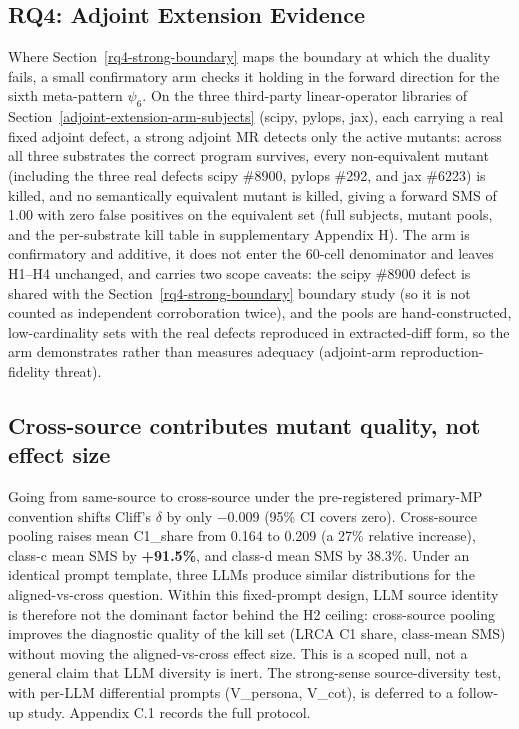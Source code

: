\documentclass[12pt]{article}
\begin{document}
\subsection{RQ4: Adjoint Extension Evidence}\label{rq4-adjoint-extension-arm}

Where Section~\ref{rq4-strong-boundary} maps the boundary at which the duality fails, a small
confirmatory arm checks it holding in the forward direction for the sixth
meta-pattern $\psi_6$. On the three third-party linear-operator libraries
of Section~\ref{adjoint-extension-arm-subjects} (scipy, pylops, jax), each carrying a real fixed adjoint defect, a
strong adjoint MR detects only the active mutants: across all three
substrates the correct program survives, every non-equivalent mutant
(including the three real defects scipy \#8900, pylops \#292, and jax
\#6223) is killed, and no semantically equivalent mutant is killed, giving
a forward SMS of 1.00 with zero false positives on the equivalent set
(full subjects, mutant pools, and the per-substrate kill table in
supplementary Appendix H). The arm is confirmatory and additive, it
does not enter the 60-cell denominator and leaves H1--H4 unchanged, and
carries two scope caveats: the scipy \#8900 defect is shared with the Section~\ref{rq4-strong-boundary}
boundary study (so it is not counted as independent corroboration twice),
and the pools are hand-constructed, low-cardinality sets with the real
defects reproduced in extracted-diff form, so the arm demonstrates rather
than measures adequacy (adjoint-arm reproduction-fidelity threat).


\label{discussion}

\subsection{Cross-source contributes mutant quality, not effect size}\label{cross-source-contributes-mutant-quality-not-effect-size}

Going from same-source to cross-source under the pre-registered
primary-MP convention shifts Cliff's $\delta$ by only −0.009 (95\% CI covers
zero). Cross-source pooling raises mean C1\_share from 0.164 to 0.209 (a
27\% relative increase), class-c mean SMS by \textbf{+91.5\%}, and
class-d mean SMS by 38.3\%. Under an identical prompt template, three
LLMs produce similar distributions for the aligned-vs-cross question.
Within this fixed-prompt design, LLM source identity is therefore not the
dominant factor behind the H2 ceiling: cross-source pooling improves the
diagnostic quality of the kill set (LRCA C1 share, class-mean SMS)
without moving the aligned-vs-cross effect size. This is a scoped null,
not a general claim that LLM diversity is inert. The strong-sense
source-diversity test, with per-LLM differential prompts (V\_persona,
V\_cot), is deferred to a follow-up study. Appendix C.1 records the full
protocol.
\end{document}
